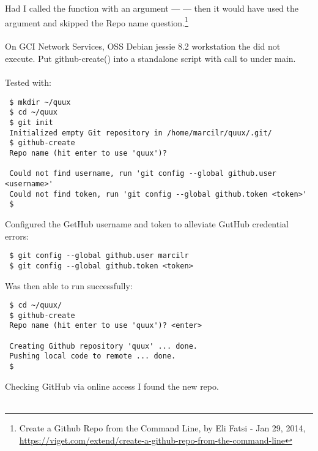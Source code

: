 \noindent Had I called the function with an argument —  —
then it would have used the argument and skipped the Repo name question.\footnote{Create a Github Repo
from the Command Line, by Eli Fatsi - Jan 29, 2014,\\
\href{https://viget.com/extend/create-a-github-repo-from-the-command-line}{https://viget.com/extend/create-a-github-repo-from-the-command-line}}
\\
\\
On GCI Network Services, OSS  Debian jessie 8.2
workstation the  did not execute.  Put
github-create() into a standalone 
script with call to  under main.
\\
\\
Tested with:
\begin{Verbatim}
 $ mkdir ~/quux
 $ cd ~/quux
 $ git init
 Initialized empty Git repository in /home/marcilr/quux/.git/
 $ github-create 
 Repo name (hit enter to use 'quux')?

 Could not find username, run 'git config --global github.user <username>'
 Could not find token, run 'git config --global github.token <token>'
 $
\end{Verbatim}

\newpage
\noindent Configured the GetHub username and token to alleviate GutHub credential errors:
\begin{Verbatim}
 $ git config --global github.user marcilr
 $ git config --global github.token <token>
\end{Verbatim}

\noindent Was then able to run  successfully:
\begin{Verbatim}
 $ cd ~/quux/
 $ github-create
 Repo name (hit enter to use 'quux')? <enter>

 Creating Github repository 'quux' ... done.
 Pushing local code to remote ... done.
 $
\end{Verbatim}

\noindent Checking GitHub via online access I found the new  repo.
\\
\\
\noindent {}



